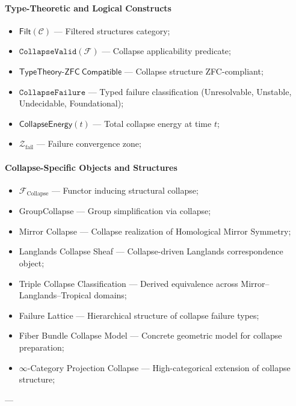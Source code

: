 \documentclass[11pt]{article}
\begin{document}
\paragraph{Type-Theoretic and Logical Constructs}

\begin{itemize}
    \item $\mathsf{Filt}(\mathcal{C})$ — Filtered structures category;
    \item $\texttt{CollapseValid}(\mathcal{F})$ — Collapse applicability predicate;
    \item $\mathsf{TypeTheory\text{-}ZFC\ Compatible}$ — Collapse structure ZFC-compliant;
    \item $\texttt{CollapseFailure}$ — Typed failure classification (Unresolvable, Unstable, Undecidable, Foundational);
    \item $\mathsf{CollapseEnergy}(t)$ — Total collapse energy at time $t$;
    \item $\mathcal{Z}_{\mathrm{fail}}$ — Failure convergence zone;
\end{itemize}

\paragraph{Collapse-Specific Objects and Structures}

\begin{itemize}
    \item $\mathcal{F}_{\mathrm{Collapse}}$ — Functor inducing structural collapse;
    \item $\mathrm{GroupCollapse}$ — Group simplification via collapse;
    \item Mirror Collapse — Collapse realization of Homological Mirror Symmetry;
    \item Langlands Collapse Sheaf — Collapse-driven Langlands correspondence object;
    \item Triple Collapse Classification — Derived equivalence across Mirror–Langlands–Tropical domains;
    \item Failure Lattice — Hierarchical structure of collapse failure types;
    \item Fiber Bundle Collapse Model — Concrete geometric model for collapse preparation;
    \item $\infty$-Category Projection Collapse — High-categorical extension of collapse structure;
\end{itemize}

---
\end{document}
